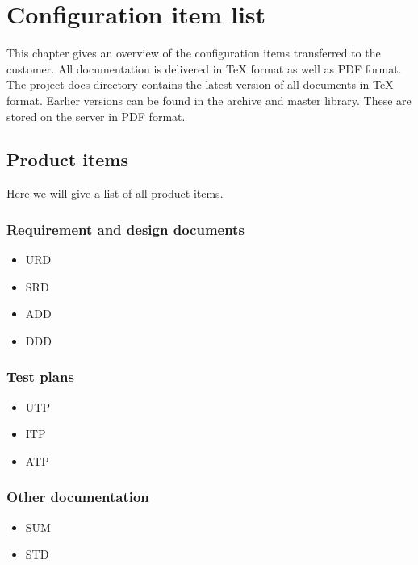 \chapter{Configuration item list}
\label{chap:confList}
This chapter gives an overview of the configuration items transferred to the customer. All
documentation is delivered in \TeX{} format as well as PDF format. The project-docs directory
contains the latest version of all documents in \TeX{} format. Earlier
versions can be found in the archive and master library. These are stored on the \projectname{} 
server in PDF format.

\section{Product items}
\label{sec:prodItems}

Here we will give a list of all product items.

\subsection{Requirement and design documents}
\begin{itemize}
\item URD \cite{urd}
\item SRD \cite{srd}
\item ADD \cite{add}
\item DDD \cite{ddd}
\end{itemize}

\subsection{Test plans}
\begin{itemize}
\item UTP \cite{utp}
\item ITP \cite{itp}
\item ATP \cite{atp}
\end{itemize}

\subsection{Other documentation}
\begin{itemize}
\item SUM \cite{sum}
\item STD \cite {std}
\end{itemize}

